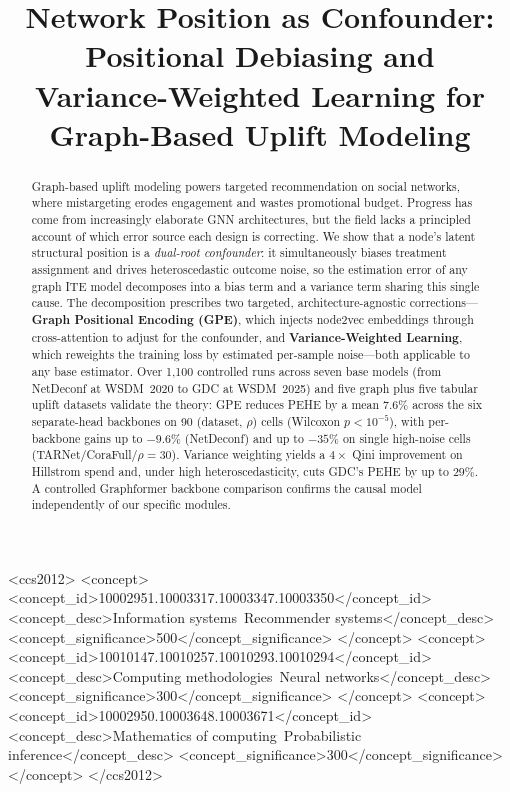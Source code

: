 \documentclass[sigconf,anonymous,review]{acmart}
\begin{document}
\title{Network Position as Confounder: Positional Debiasing and\\Variance-Weighted Learning for Graph-Based Uplift Modeling}

\begin{CCSXML}
<ccs2012>
<concept>
<concept_id>10002951.10003317.10003347.10003350</concept_id>
<concept_desc>Information systems~Recommender systems</concept_desc>
<concept_significance>500</concept_significance>
</concept>
<concept>
<concept_id>10010147.10010257.10010293.10010294</concept_id>
<concept_desc>Computing methodologies~Neural networks</concept_desc>
<concept_significance>300</concept_significance>
</concept>
<concept>
<concept_id>10002950.10003648.10003671</concept_id>
<concept_desc>Mathematics of computing~Probabilistic inference</concept_desc>
<concept_significance>300</concept_significance>
</concept>
</ccs2012>
\end{CCSXML}

\begin{abstract}
Graph-based uplift modeling powers targeted recommendation on social networks, where mistargeting erodes engagement and wastes promotional budget. Progress has come from increasingly elaborate GNN architectures, but the field lacks a principled account of which error source each design is correcting. We show that a node's latent structural position is a \emph{dual-root confounder}: it simultaneously biases treatment assignment and drives heteroscedastic outcome noise, so the estimation error of any graph ITE model decomposes into a bias term and a variance term sharing this single cause. The decomposition prescribes two targeted, architecture-agnostic corrections---\textbf{Graph Positional Encoding (GPE)}, which injects node2vec embeddings through cross-attention to adjust for the confounder, and \textbf{Variance-Weighted Learning}, which reweights the training loss by estimated per-sample noise---both applicable to any base estimator. Over 1{,}100 controlled runs across seven base models (from NetDeconf at WSDM~2020 to GDC at WSDM~2025) and five graph plus five tabular uplift datasets validate the theory: GPE reduces PEHE by a mean $7.6\%$ across the six separate-head backbones on 90 (dataset, $\rho$) cells (Wilcoxon $p<10^{-5}$), with per-backbone gains up to $-9.6\%$ (NetDeconf) and up to $-35\%$ on single high-noise cells (TARNet/CoraFull/$\rho{=}30$). Variance weighting yields a $4{\times}$ Qini improvement on Hillstrom spend and, under high heteroscedasticity, cuts GDC's PEHE by up to $29\%$. A controlled Graphformer backbone comparison confirms the causal model independently of our specific modules.
\end{abstract}
\end{document}
